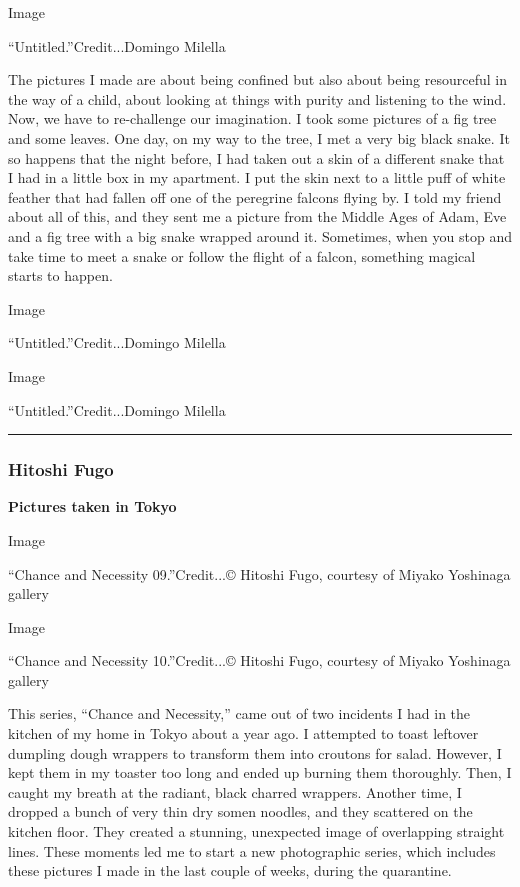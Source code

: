 Image

``Untitled.''Credit...Domingo Milella

The pictures I made are about being confined but also about being
resourceful in the way of a child, about looking at things with purity
and listening to the wind. Now, we have to re-challenge our imagination.
I took some pictures of a fig tree and some leaves. One day, on my way
to the tree, I met a very big black snake. It so happens that the night
before, I had taken out a skin of a different snake that I had in a
little box in my apartment. I put the skin next to a little puff of
white feather that had fallen off one of the peregrine falcons flying
by. I told my friend about all of this, and they sent me a picture from
the Middle Ages of Adam, Eve and a fig tree with a big snake wrapped
around it. Sometimes, when you stop and take time to meet a snake or
follow the flight of a falcon, something magical starts to happen.

Image

``Untitled.''Credit...Domingo Milella

Image

``Untitled.''Credit...Domingo Milella

\begin{center}\rule{0.5\linewidth}{\linethickness}\end{center}

\hypertarget{hitoshi-fugo}{%
\subsubsection{\texorpdfstring{\textbf{Hitoshi
Fugo}}{Hitoshi Fugo}}\label{hitoshi-fugo}}

\textbf{Pictures taken in Tokyo}

Image

``Chance and Necessity 09.''Credit...© Hitoshi Fugo, courtesy of Miyako
Yoshinaga gallery

Image

``Chance and Necessity 10.''Credit...© Hitoshi Fugo, courtesy of Miyako
Yoshinaga gallery

This series, ``Chance and Necessity,'' came out of two incidents I had
in the kitchen of my home in Tokyo about a year ago. I attempted to
toast leftover dumpling dough wrappers to transform them into croutons
for salad. However, I kept them in my toaster too long and ended up
burning them thoroughly. Then, I caught my breath at the radiant, black
charred wrappers. Another time, I dropped a bunch of very thin dry somen
noodles, and they scattered on the kitchen floor. They created a
stunning, unexpected image of overlapping straight lines. These moments
led me to start a new photographic series, which includes these pictures
I made in the last couple of weeks, during the quarantine.

